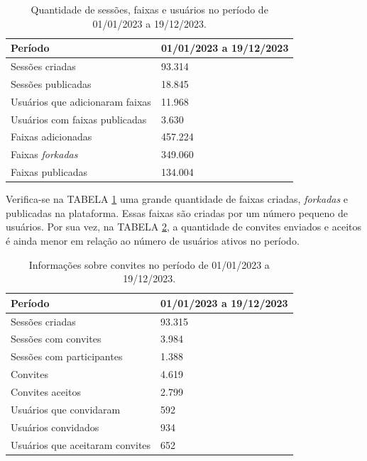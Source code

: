 \begin{table}[H]
  \centering
  \begin{tabular}{|l|l|}
    \hline
    \textbf{Período} & 01/01/2023 a 19/12/2023 \\ \hline
    Sessões criadas & 93.314 \\ \hline
    Sessões publicadas & 18.845 \\ \hline
    Usuários que adicionaram faixas & 11.968 \\ \hline
    Usuários com faixas publicadas & 3.630 \\ \hline
    Faixas adicionadas & 457.224 \\ \hline
    Faixas \textit{forkadas} & 349.060 \\ \hline
    Faixas publicadas & 134.004 \\ \hline
  \end{tabular}
  \caption{Quantidade de sessões, faixas e usuários no período de 01/01/2023 a 19/12/2023.}
  \label{tab_sessoes}
\end{table}

Verifica-se na TABELA \ref{tab_sessoes} uma grande quantidade de faixas criadas,
\textit{forkadas} e publicadas na plataforma. Essas faixas são criadas por um
número pequeno de usuários. Por sua vez, na TABELA \ref{tab_convites}, a
quantidade de convites enviados e aceitos é ainda menor em relação ao número de
usuários ativos no período.

\begin{table}[htbp]
  \centering
  \begin{tabular}{|l|l|}
    \hline
    \textbf{Período} & 01/01/2023 a 19/12/2023 \\ \hline
    Sessões criadas & 93.315 \\ \hline
    Sessões com convites & 3.984 \\ \hline
    Sessões com participantes & 1.388 \\ \hline
    Convites & 4.619 \\ \hline
    Convites aceitos & 2.799 \\ \hline
    Usuários que convidaram & 592 \\ \hline
    Usuários convidados & 934 \\ \hline
    Usuários que aceitaram convites & 652 \\ \hline
  \end{tabular}
  \caption{Informações sobre convites no período de 01/01/2023 a 19/12/2023.}
  \label{tab_convites}
\end{table}


